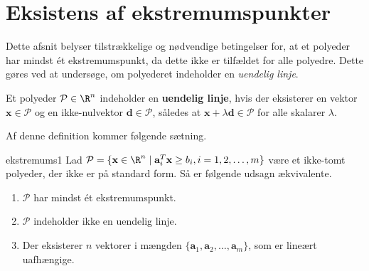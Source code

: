 \section{Eksistens af ekstremumspunkter}
%
Dette afsnit belyser tilstrækkelige og nødvendige betingelser for, at et polyeder har mindst ét ekstremumspunkt, da dette ikke er tilfældet for alle polyedre. 
Dette gøres ved at undersøge, om polyederet indeholder en \textit{uendelig linje}.
%
\begin{defn}{}{}
Et polyeder $\mathcal{P} \in \R^n$ indeholder en \textbf{uendelig linje}, hvis der eksisterer en vektor $\textbf{x} \in \mathcal{P}$ og en ikke-nulvektor $\textbf{d} \in \mathcal{P}$, således at $\textbf{x} + \lambda \textbf{d} \in \mathcal{P}$ for alle skalarer $\lambda$.
\end{defn}
\noindent
%
Af denne definition kommer følgende sætning.
%
\begin{thm}{}{ekstremums1}
Lad $\mathcal{P} = \{\textbf{x} \in \R^n \mid \textbf{a}_i^T\textbf{x} \geq b_i, i = 1,2,\ldots,m  \}$ være et ikke-tomt polyeder, der ikke er på standard form.
Så er følgende udsagn ækvivalente.
%
\begin{enumerate}[label = (\alph*)]
\item $\mathcal{P}$ har mindst ét ekstremumspunkt.
\item $\mathcal{P}$ indeholder ikke en uendelig linje.
\item Der eksisterer $n$ vektorer i mængden $\{\mathbf{a}_1, \mathbf{a}_2, \ldots , \mathbf{a}_m \}$, som er lineært uafhængige.
\end{enumerate}
\end{thm}
%
